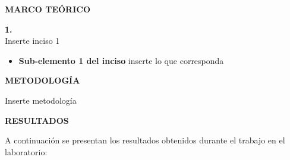 \documentclass[12pt]{article}
\begin{document}
	\newpage
	
	
	\begin{center}
		\textbf{\large MARCO TEÓRICO}\\
	\end{center}
	
	\textbf{1. }\\
	
	Inserte inciso 1
	
	\begin{itemize}
		\item \textbf{Sub-elemento 1 del inciso } inserte lo que corresponda
		
	\end{itemize}

	\newpage
	
	\begin{center}
		\textbf{\large METODOLOGÍA}\\
	\end{center}
	
	Inserte metodología
	
	\newpage
	
	\begin{center}
		\textbf{\large RESULTADOS}\\
	\end{center}
	
	A continuación se presentan los resultados obtenidos durante el trabajo en el laboratorio:
	
\end{document}
